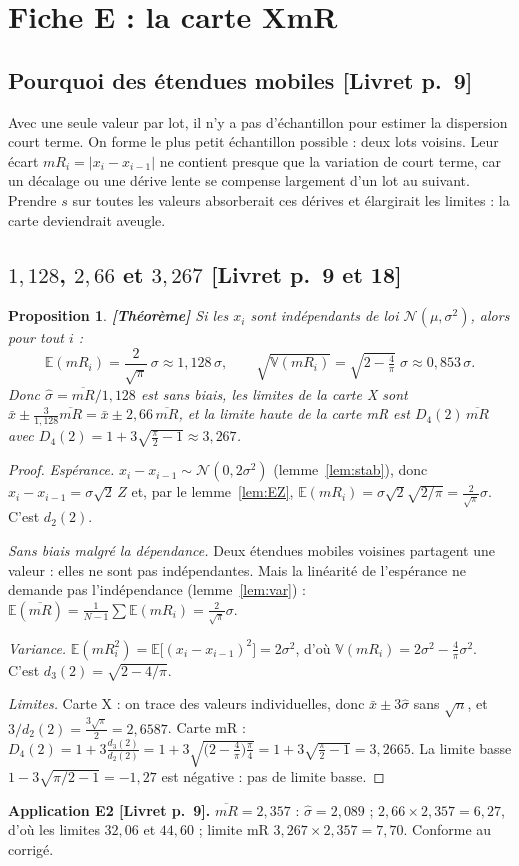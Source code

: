 \documentclass[11pt,a4paper]{article}
\theoremstyle{tq}
\newtheorem{prop}{Proposition}
\theoremstyle{remark}
\newcommand{\thm}{\textcolor{vertTQ}{\textbf{[Théorème]}}}
\newcommand{\liv}[1]{\textcolor{uimmblue}{\small[Livret p.~#1]}}
\newcommand{\E}{\mathbb{E}}
\newcommand{\V}{\mathbb{V}}
\newcommand{\N}{\mathcal{N}}
\newcommand{\mRb}{\overline{mR}}
\begin{document}
\section{Fiche E : la carte XmR}\label{sec:E}

\subsection{Pourquoi des étendues mobiles \liv{9}}
Avec une seule valeur par lot, il n'y a pas d'échantillon pour estimer la dispersion court terme. On forme le plus petit échantillon possible : deux lots voisins. Leur écart $mR_i=|x_i-x_{i-1}|$ ne contient presque que la variation de court terme, car un décalage ou une dérive lente se compense largement d'un lot au suivant. Prendre $s$ sur toutes les valeurs absorberait ces dérives et élargirait les limites : la carte deviendrait aveugle.

\subsection{$1{,}128$, $2{,}66$ et $3{,}267$ \liv{9 et 18}}
\begin{prop}\thm{}
Si les $x_i$ sont indépendants de loi $\N(\mu,\sigma^2)$, alors pour tout $i$ :
\[
\E(mR_i)=\frac{2}{\sqrt\pi}\,\sigma\approx1{,}128\,\sigma,\qquad \sqrt{\V(mR_i)}=\sqrt{2-\tfrac4\pi}\;\sigma\approx0{,}853\,\sigma .
\]
Donc $\hat\sigma=\mRb/1{,}128$ est sans biais, les limites de la carte X sont $\bar x\pm\frac{3}{1{,}128}\mRb=\bar x\pm2{,}66\,\mRb$, et la limite haute de la carte mR est $D_4(2)\,\mRb$ avec $D_4(2)=1+3\sqrt{\tfrac\pi2-1}\approx3{,}267$.
\end{prop}
\begin{proof}
\emph{Espérance.} $x_i-x_{i-1}\sim\N(0,2\sigma^2)$ (lemme~\ref{lem:stab}), donc $x_i-x_{i-1}=\sigma\sqrt2\,Z$ et, par le lemme~\ref{lem:EZ}, $\E(mR_i)=\sigma\sqrt2\sqrt{2/\pi}=\frac{2}{\sqrt\pi}\sigma$. C'est $d_2(2)$.

\emph{Sans biais malgré la dépendance.} Deux étendues mobiles voisines partagent une valeur : elles ne sont pas indépendantes. Mais la linéarité de l'espérance ne demande pas l'indépendance (lemme~\ref{lem:var}) : $\E(\mRb)=\frac{1}{N-1}\sum\E(mR_i)=\frac{2}{\sqrt\pi}\sigma$.

\emph{Variance.} $\E(mR_i^2)=\E\big[(x_i-x_{i-1})^2\big]=2\sigma^2$, d'où $\V(mR_i)=2\sigma^2-\frac4\pi\sigma^2$. C'est $d_3(2)=\sqrt{2-4/\pi}$.

\emph{Limites.} Carte X : on trace des valeurs individuelles, donc $\bar x\pm3\hat\sigma$ sans $\sqrt n$, et $3/d_2(2)=\frac{3\sqrt\pi}{2}=2{,}6587$. Carte mR : $D_4(2)=1+3\frac{d_3(2)}{d_2(2)}=1+3\sqrt{\big(2-\tfrac4\pi\big)\tfrac\pi4}=1+3\sqrt{\tfrac\pi2-1}=3{,}2665$. La limite basse $1-3\sqrt{\pi/2-1}=-1{,}27$ est négative : pas de limite basse.
\end{proof}
\textbf{Application E2 \liv{9}.} $\mRb=2{,}357$ : $\hat\sigma=2{,}089$ ; $2{,}66\times2{,}357=6{,}27$, d'où les limites $32{,}06$ et $44{,}60$ ; limite mR $3{,}267\times2{,}357=7{,}70$. Conforme au corrigé.
\end{document}
